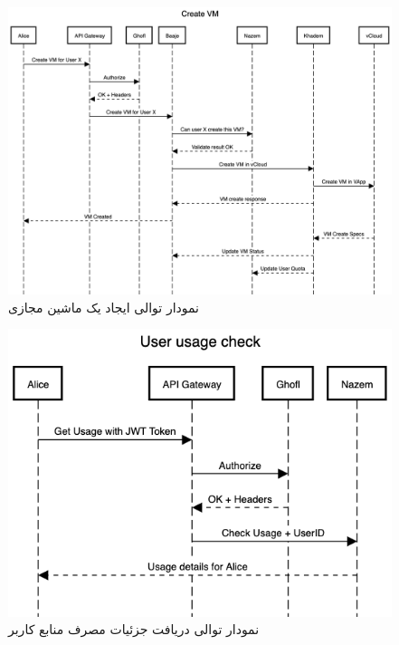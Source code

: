 \begin{figure}
	\centering
	\includegraphics[width=1\linewidth]{figures/create-vm-sequence}
	\caption{نمودار توالی ایجاد یک ماشین مجازی}
	\label{fig:create-vm-sequence}
\end{figure}
\begin{figure}
	\centering
	\includegraphics[width=1\linewidth]{figures/user-usage-sequence}
	\caption{نمودار توالی دریافت جزئیات مصرف منابع کاربر}
	\label{fig:user-usage-sequence}
\end{figure}

